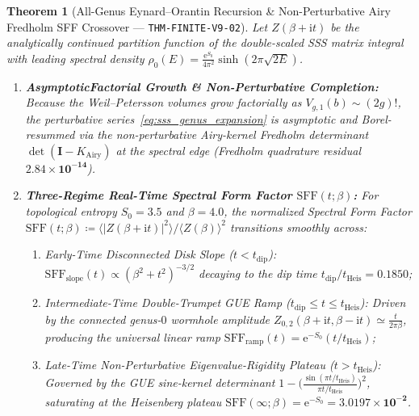 \documentclass[11pt,a4paper,reqno]{article}
\theoremstyle{plain}
\newtheorem{theorem}{Theorem}[section]
\theoremstyle{definition}
\theoremstyle{remark}
\numberwithin{equation}{section}
\begin{document}
\begin{theorem}[{All-Genus Eynard--Orantin Recursion \& Non-Perturbative Airy Fredholm SFF Crossover --- \texttt{THM-FINITE-V9-02}}]
\label{thm:v9_sss_eynard_orantin}
Let $Z(\beta + \mathrm{i}t)$ be the analytically continued partition function of the double-scaled SSS matrix integral with leading spectral density $\rho_0(E) = \frac{\mathrm{e}^{S_0}}{4\pi^2}\sinh(2\pi\sqrt{2E})$.
\begin{enumerate}
    \item \textbf{AsymptoticFactorial Growth \& Non-Perturbative Completion:} Because the Weil--Petersson volumes grow factorially as $V_{g,1}(b) \sim (2g)!$, the perturbative series~\eqref{eq:sss_genus_expansion} is asymptotic and Borel-resummed via the non-perturbative Airy-kernel Fredholm determinant $\det(\bm{I} - K_{\mathrm{Airy}})$ at the spectral edge (Fredholm quadrature residual $\bm{2.84 \times 10^{-14}}$).
    \item \textbf{Three-Regime Real-Time Spectral Form Factor $\mathrm{SFF}(t;\beta)$:} For topological entropy $S_0 = 3.5$ and $\beta = 4.0$, the normalized Spectral Form Factor $\mathrm{SFF}(t;\beta) \coloneqq \langle |Z(\beta+\mathrm{i}t)|^2 \rangle / \langle Z(\beta) \rangle^2$ transitions smoothly across:
    \begin{enumerate}[label=(\alph*)]
        \item \emph{Early-Time Disconnected Disk Slope ($t < t_{\mathrm{dip}}$):} $\mathrm{SFF}_{\mathrm{slope}}(t) \propto (\beta^2 + t^2)^{-3/2}$ decaying to the dip time $t_{\mathrm{dip}}/t_{\mathrm{Heis}} = \bm{0.1850}$;
        \item \emph{Intermediate-Time Double-Trumpet GUE Ramp ($t_{\mathrm{dip}} \le t \le t_{\mathrm{Heis}}$):} Driven by the connected genus-$0$ wormhole amplitude $Z_{0,2}(\beta+\mathrm{i}t, \beta-\mathrm{i}t) \simeq \frac{t}{2\pi\beta}$, producing the universal linear ramp $\mathrm{SFF}_{\mathrm{ramp}}(t) = \mathrm{e}^{-S_0}(t/t_{\mathrm{Heis}})$;
        \item \emph{Late-Time Non-Perturbative Eigenvalue-Rigidity Plateau ($t > t_{\mathrm{Heis}}$):} Governed by the GUE sine-kernel determinant $1 - \bigl(\frac{\sin(\pi t/t_{\mathrm{Heis}})}{\pi t/t_{\mathrm{Heis}}}\bigr)^2$, saturating at the Heisenberg plateau $\mathrm{SFF}(\infty;\beta) = \mathrm{e}^{-S_0} = \bm{3.0197 \times 10^{-2}}$.
    \end{enumerate}
\end{enumerate}
\end{theorem}
\end{document}

